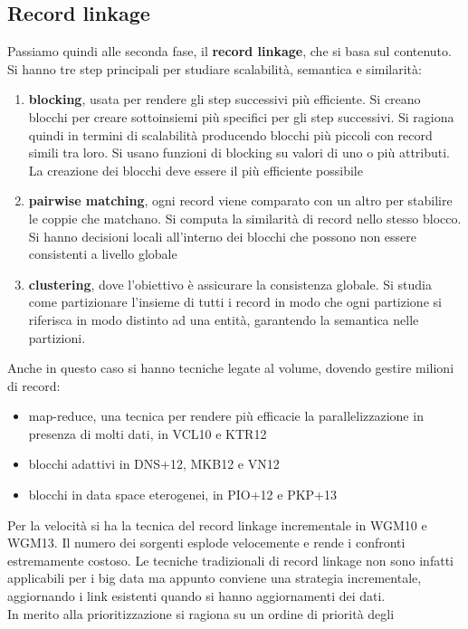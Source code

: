 \documentclass[a4paper,12pt, oneside]{book}
\begin{document}
\subsection{Record linkage}
Passiamo quindi alle seconda fase, il \textbf{record linkage}, che si basa sul
contenuto.\\
Si hanno tre step principali per studiare scalabilità, semantica e similarità:
\begin{enumerate}
  \item \textbf{blocking}, usata per rendere gli step successivi più
  efficiente. Si creano blocchi per creare sottoinsiemi più specifici per gli
  step successivi. Si ragiona quindi in termini di scalabilità producendo
  blocchi più piccoli con record simili tra loro. Si usano funzioni di blocking
  su valori di uno o più attributi. La creazione dei blocchi deve essere il più
  efficiente possibile
  \item \textbf{pairwise matching}, ogni record viene comparato con un altro
  per stabilire le coppie che matchano. Si computa la similarità di record
  nello stesso blocco. Si hanno decisioni locali all'interno dei blocchi che
  possono non essere consistenti a livello globale
  \item \textbf{clustering}, dove l'obiettivo è assicurare la consistenza
  globale. Si studia come partizionare l'insieme di tutti i record in modo che
  ogni partizione si riferisca in modo distinto ad una entità, garantendo la
  semantica nelle partizioni.
\end{enumerate}
Anche in questo caso si hanno tecniche legate al volume, dovendo gestire
milioni di record:
\begin{itemize}
  \item map-reduce, una tecnica per rendere più efficacie la parallelizzazione
  in presenza di molti dati, in VCL10 e KTR12
  \item blocchi adattivi in DNS+12, MKB12 e VN12
  \item blocchi in data space eterogenei, in PIO+12 e PKP+13
\end{itemize}
Per la velocità si ha la tecnica del record linkage incrementale in WGM10 e
WGM13. Il numero dei sorgenti esplode velocemente e rende i confronti
estremamente costoso. Le tecniche tradizionali di record linkage non sono
infatti applicabili per i big data ma appunto conviene una strategia
incrementale, aggiornando i link esistenti quando si hanno aggiornamenti dei
dati. \\
In merito alla prioritizzazione si ragiona su un ordine di priorità degli
\end{document}
